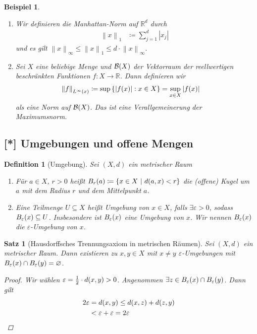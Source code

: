 \documentclass[11pt, twoside, a4paper]{article}
\theoremstyle{plain}
\newtheorem{definition}[blockelement]{Definition}
\newtheorem{satz}[blockelement]{Satz}
\newtheorem{beispiel}[blockelement]{Beispiel}
\numberwithin{equation}{subsection}
\newcommand{\set}[1]{\left\{#1\right\}}
\newcommand{\pair}[1]{\left(#1\right)}
\newcommand{\of}[1]{\mathopen{}\mathclose{}\bgroup\left(#1\aftergroup\egroup\right)}
\newcommand{\abs}[1]{\left\lvert#1\right\rvert}
\newcommand{\norm}[1]{\left\lVert#1\right\rVert}
\newcommand{\fromto}{\rightarrow{}}
\renewcommand{\emptyset}{\varnothing}
\newcommand{\R}{\mathbb{R}}
\begin{document}
\begin{beispiel}
\begin{enumerate}
            \item Wir definieren die Manhattan-Norm auf $\R^d$ durch
            \begin{align*}
                \norm{x}_1 &\coloneqq \sum_{j=1}^{d} \abs{x_j}
            \end{align*}
            und es gilt $\norm{x}_{\infty} \leq \norm{x}_1 \leq d \cdot \norm{x}_{\infty}$.
            \item Sei $X$ eine beliebige Menge und $\mathcal{B}\of{X}$ der Vektorraum der reellwertigen beschränkten Funktionen $f: X\fromto \R$. Dann definieren wir
            \begin{align*}
                \norm{f}_{L^{\infty}\of{x}} &\coloneqq \sup\set{\abs{f\of{x}}: x\in X} = \sup_{x\in X} \abs{f\of{x}}
            \end{align*}
            als eine Norm auf $\mathcal{B}\of{X}$. Das ist eine Verallgemeinerung der Maximumsnorm.
        \end{enumerate}
    \end{beispiel}

    \subsection{[*] Umgebungen und offene Mengen}

    \begin{definition}[Umgebung]
        Sei $\pair{X, d}$ ein metrischer Raum
        \begin{enumerate}[label=(\alph*)]
            \item Für $a\in X$, $r > 0$ heißt $B_r\of{a} \coloneqq \set{x\in X ~\middle\vert~ d\of{a, x} < r}$ die (offene) Kugel um $a$ mit dem Radius $r$ und dem Mittelpunkt $a$.
            \item Eine Teilmenge $U\subseteq X$ heißt \emph{Umgebung} von $x\in X$, falls $\exists\varepsilon > 0$, sodass $B_{\varepsilon}\of{x} \subseteq U$. Insbesondere ist $B_{\varepsilon}\of{x}$ eine Umgebung von $x$. Wir nennen $B_{\varepsilon}\of{x}$ die $\varepsilon$-Umgebung von $x$.
        \end{enumerate}
    \end{definition}

    \begin{satz}[Hausdorffsches Trennungsaxiom in metrischen Räumen]
        \label{satz:hausdorff-trennungsaxiom}
        Sei $\pair{X, d}$ ein metrischer Raum. Dann existieren zu $x,y\in X$ mit $x\neq y$ $\varepsilon$-Umgebungen mit $B_{\varepsilon}\of{x} \cap B_{\varepsilon}\of{y} = \emptyset$.
        \begin{proof}
            Wir wählen $\varepsilon = \frac{1}{2}\cdot d\of{x,y} > 0$. Angenommen $\exists z\in B_{\varepsilon}\of{x} \cap B_{\varepsilon}\of{y}$. Dann gilt
            \begin{align*}
                2\varepsilon &= d\of{x,y} \leq d\of{x,z} + d\of{z,y}\\
                &< \varepsilon + \varepsilon = 2\varepsilon\qedhere
            \end{align*}
        \end{proof}
    \end{satz}
\end{document}
